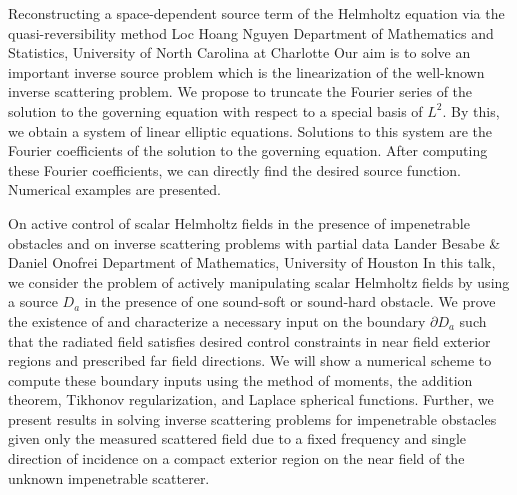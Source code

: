 \begin{addmargin}[2em]{0em}
\vspace{1.5ex}
\abs
{Reconstructing a space-dependent source term of the Helmholtz equation via the quasi-reversibility method}
{Loc Hoang Nguyen}
{Department of Mathematics and Statistics, University of North Carolina at Charlotte}
{Our aim is to solve an important inverse source problem which is the linearization of the well-known inverse scattering problem. We propose to truncate the Fourier series of the solution to the governing equation with respect to a special basis of $L^2$. By this, we obtain a system of linear elliptic equations. Solutions to this system are the Fourier coefficients of the solution to the governing equation. After computing these Fourier coefficients, we can directly find the desired source function. Numerical examples are presented.}


\vspace{1.5ex}
\abs
{On active control of scalar Helmholtz fields in the presence of impenetrable obstacles and on inverse scattering problems with partial data}
{Lander Besabe \& Daniel Onofrei}
{Department of Mathematics, University of Houston}
{In this talk, we consider the problem of actively manipulating scalar Helmholtz fields by using a source $D_a$ in the presence of one sound-soft or sound-hard obstacle. We prove the existence of and characterize a necessary input on the boundary $\partial D_a$ such that the radiated field satisfies desired control constraints in near field exterior regions and prescribed far field directions. We will show a numerical scheme to compute these boundary inputs using the method of moments, the addition theorem, Tikhonov regularization, and Laplace spherical functions. Further, we present results in solving inverse scattering problems for impenetrable obstacles given only the measured scattered field due to a fixed frequency and single direction of incidence on a compact exterior region on the near field of the unknown impenetrable scatterer.}


\end{addmargin}
